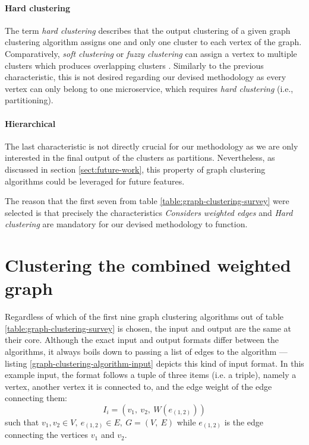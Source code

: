 \documentclass[12pt,a4paper]{report}
\begin{document}
\paragraph{Hard clustering}
The term \textit{hard clustering} describes that
the output clustering of a given graph clustering algorithm assigns one and
only one cluster to each vertex of the graph. Comparatively, \textit{soft
clustering} or \textit{fuzzy clustering} can assign a vertex to multiple
clusters which produces overlapping clusters \cite{lancichinetti2009community}.
Similarly to the previous characteristic, this is not desired regarding our
devised methodology as every vertex can only belong to one microservice, which
requires \textit{hard clustering} (i.e., partitioning).

\paragraph{Hierarchical}
The last characteristic is not directly crucial for
our methodology as we are only interested in the final output of the clusters
as partitions. Nevertheless, as discussed in section \ref{sect:future-work},
this property of graph clustering algorithms could be leveraged for future
features. \newline

The reason that the first seven from table \ref{table:graph-clustering-survey}
were selected is that precisely the characteristics \textit{Considers weighted
edges} and \textit{Hard clustering} are mandatory for our devised methodology
to function.



\section{Clustering the combined weighted graph}

Regardless of which of the first nine graph clustering algorithms out of table
\ref{table:graph-clustering-survey} is chosen, the input and output are the
same at their core. Although the exact input and output formats differ between
the algorithms, it always boils down to passing a list of edges to the
algorithm --- listing \ref{graph-clustering-algorithm-input} depicts this kind
of input format. In this example input, the format follows a tuple of three
items (i.e. a triple), namely a vertex, another vertex it is connected to, and
the edge weight of the edge connecting them:
\[
  I_i = (v_1, \ v_2, \ W(e_{(1,2)}))
\]
such that \(v_1, v_2 \in V, \ e_{(1,2)} \in E, \ G = (V, \ E)\) while
\(e_{(1,2)}\) is the edge connecting the vertices \(v_1\) and \(v_2\).
\end{document}
